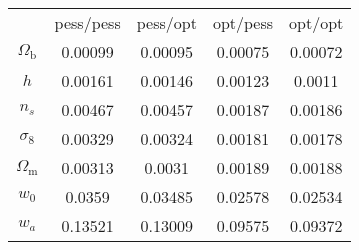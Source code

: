 \begin{table}
\centering
\begin{tabular}{|c|c|c|c|c|}
 & pess/pess & pess/opt & opt/pess & opt/opt \\
$\Omega_\mathrm{b}$ & 0.00099 & 0.00095 & 0.00075 & 0.00072 \\
$h$ & 0.00161 & 0.00146 & 0.00123 & 0.0011 \\
$n_s$ & 0.00467 & 0.00457 & 0.00187 & 0.00186 \\
$\sigma_8$ & 0.00329 & 0.00324 & 0.00181 & 0.00178 \\
$\Omega_\mathrm{m}$ & 0.00313 & 0.0031 & 0.00189 & 0.00188 \\
$w_0$ & 0.0359 & 0.03485 & 0.02578 & 0.02534 \\
$w_a$ & 0.13521 & 0.13009 & 0.09575 & 0.09372 \\
\end{tabular}
\end{table}
